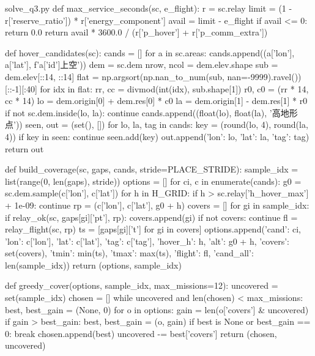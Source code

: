 \documentclass[bwprint]{gmcmthesis}
\begin{document}
\begin{appendices}
\begin{Python}{solve\_q3.py}
def max_service_seconds(sc, e_flight):
    r = sc.relay
    limit = (1 - r['reserve_ratio']) * r['energy_component']
    avail = limit - e_flight
    if avail <= 0:
        return 0.0
    return avail * 3600.0 / (r['p_hover'] + r['p_comm_extra'])

def hover_candidates(sc):
    cands = []
    for a in sc.areas:
        cands.append((a['lon'], a['lat'], f'{a['id']}上空'))
    dem = sc.dem
    nrow, ncol = dem.elev.shape
    sub = dem.elev[::14, ::14]
    flat = np.argsort(np.nan_to_num(sub, nan=-9999).ravel())[::-1][:40]
    for idx in flat:
        rr, cc = divmod(int(idx), sub.shape[1])
        r0, c0 = (rr * 14, cc * 14)
        lo = dem.origin[0] + dem.res[0] * c0
        la = dem.origin[1] - dem.res[1] * r0
        if not sc.dem.inside(lo, la):
            continue
        cands.append((float(lo), float(la), '高地形点'))
    seen, out = (set(), [])
    for lo, la, tag in cands:
        key = (round(lo, 4), round(la, 4))
        if key in seen:
            continue
        seen.add(key)
        out.append({'lon': lo, 'lat': la, 'tag': tag})
    return out

def build_coverage(sc, gaps, cands, stride=PLACE_STRIDE):
    sample_idx = list(range(0, len(gaps), stride))
    options = []
    for ci, c in enumerate(cands):
        g0 = sc.dem.sample(c['lon'], c['lat'])
        for h in H_GRID:
            if h > sc.relay['h_hover_max'] + 1e-09:
                continue
            rp = (c['lon'], c['lat'], g0 + h)
            covers = []
            for gi in sample_idx:
                if relay_ok(sc, gaps[gi]['pt'], rp):
                    covers.append(gi)
            if not covers:
                continue
            fl = relay_flight(sc, rp)
            ts = [gaps[gi]['t'] for gi in covers]
            options.append({'cand': ci, 'lon': c['lon'], 'lat': c['lat'], 'tag': c['tag'], 'hover_h': h, 'alt': g0 + h, 'covers': set(covers), 'tmin': min(ts), 'tmax': max(ts), 'flight': fl, 'cand_all': len(sample_idx)})
    return (options, sample_idx)

def greedy_cover(options, sample_idx, max_missions=12):
    uncovered = set(sample_idx)
    chosen = []
    while uncovered and len(chosen) < max_missions:
        best, best_gain = (None, 0)
        for o in options:
            gain = len(o['covers'] & uncovered)
            if gain > best_gain:
                best, best_gain = (o, gain)
        if best is None or best_gain == 0:
            break
        chosen.append(best)
        uncovered -= best['covers']
    return (chosen, uncovered)


\end{Python}
\end{appendices}
\end{document}
